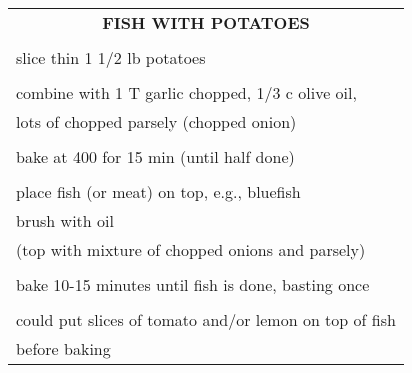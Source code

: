 \documentclass[8pt]{report}
\begin{document}
\begin{tabular}{|l|} \hline	%
 
\multicolumn{1}{|c|}{\textbf{FISH WITH POTATOES}}
\\
\\

\index{fish/meat!fish with potatoes} \index{fish with potatoes}

slice thin 1 1/2 lb potatoes\\
\\
combine with 1 T garlic chopped, 1/3 c olive oil, \\
lots of chopped parsely (chopped onion)\\
\\
bake at 400 for 15 min (until half done)\\
\\
place fish (or meat) on top, e.g., bluefish\\
brush with oil\\
(top with mixture of chopped onions and parsely)\\
\\
bake 10-15 minutes until fish is done, basting once\\
\\
could put slices of tomato and/or lemon on top of fish\\
before baking\\


\hline

\end{tabular}

\newpage

\centering
\end{document}
